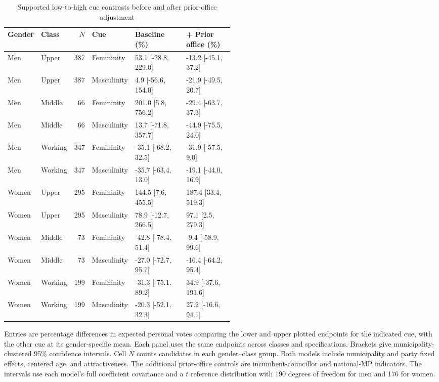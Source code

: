 \documentclass[11pt,a4paper]{article}\usepackage[]{graphicx}\usepackage[]{xcolor}
\begin{document}
\begin{table}[!htbp]
\centering\footnotesize
\setlength{\tabcolsep}{4pt}
\caption{Supported low-to-high cue contrasts before and after prior-office adjustment}
\label{tab:oa-class-contrasts}
\begin{tabular}{llrlp{0.26\linewidth}p{0.26\linewidth}}
\toprule
Gender & Class & $N$ & Cue & Baseline (\%) & + Prior office (\%) \\
\midrule
Men & Upper & 387 & Femininity & 53.1 [-28.8, 229.0] & -13.2 [-45.1, 37.2] \\
Men & Upper & 387 & Masculinity & 4.9 [-56.6, 154.0] & -21.9 [-49.5, 20.7] \\
Men & Middle & 66 & Femininity & 201.0 [5.8, 756.2] & -29.4 [-63.7, 37.3] \\
Men & Middle & 66 & Masculinity & 13.7 [-71.8, 357.7] & -44.9 [-75.5, 24.0] \\
Men & Working & 347 & Femininity & -35.1 [-68.2, 32.5] & -31.9 [-57.5, 9.0] \\
Men & Working & 347 & Masculinity & -35.7 [-63.4, 13.0] & -19.1 [-44.0, 16.9] \\
Women & Upper & 295 & Femininity & 144.5 [7.6, 455.5] & 187.4 [33.4, 519.3] \\
Women & Upper & 295 & Masculinity & 78.9 [-12.7, 266.5] & 97.1 [2.5, 279.3] \\
Women & Middle & 73 & Femininity & -42.8 [-78.4, 51.4] & -9.4 [-58.9, 99.6] \\
Women & Middle & 73 & Masculinity & -27.0 [-72.7, 95.7] & -16.4 [-64.2, 95.4] \\
Women & Working & 199 & Femininity & -31.3 [-75.1, 89.2] & 34.9 [-37.6, 191.6] \\
Women & Working & 199 & Masculinity & -20.3 [-52.1, 32.3] & 27.2 [-16.6, 94.1] \\
\bottomrule
\end{tabular}

\par\smallskip
\begin{minipage}{\linewidth}\footnotesize
Entries are percentage differences in expected personal votes comparing the lower and upper plotted endpoints for the indicated cue, with the other cue at its gender-specific mean. Each panel uses the same endpoints across classes and specifications. Brackets give municipality-clustered 95\% confidence intervals. Cell $N$ counts candidates in each gender--class group. Both models include municipality and party fixed effects, centered age, and attractiveness. The additional prior-office controls are incumbent-councillor and national-MP indicators. The intervals use each model's full coefficient covariance and a $t$ reference distribution with 190 degrees of freedom for men and 176 for women.
\end{minipage}
\end{table}
\end{document}
